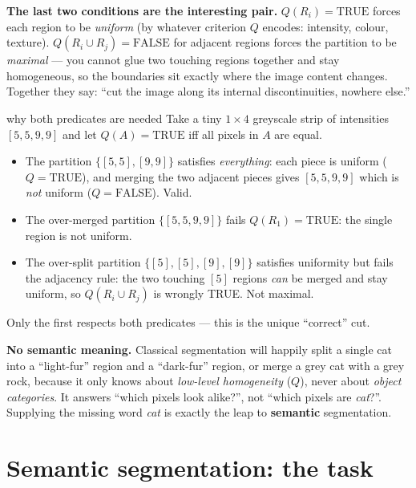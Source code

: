 \documentclass{report}
\begin{document}
\begin{keybox}
\textbf{The last two conditions are the interesting pair.} $Q(R_i)=\text{TRUE}$
forces each region to be \emph{uniform} (by whatever criterion $Q$ encodes:
intensity, colour, texture). $Q(R_i \cup R_j)=\text{FALSE}$ for adjacent regions
forces the partition to be \emph{maximal} --- you cannot glue two touching
regions together and stay homogeneous, so the boundaries sit exactly where the
image content changes. Together they say: ``cut the image along its internal
discontinuities, nowhere else.''
\end{keybox}

\begin{exbox}{why both predicates are needed}
Take a tiny $1\times 4$ greyscale strip of intensities $[5,5,9,9]$ and let
$Q(A)=\text{TRUE}$ iff all pixels in $A$ are equal.
\begin{itemize}
\item The partition $\{[5,5],[9,9]\}$ satisfies \emph{everything}: each piece is
uniform ($Q=\text{TRUE}$), and merging the two adjacent pieces gives $[5,5,9,9]$
which is \emph{not} uniform ($Q=\text{FALSE}$). Valid.
\item The over-merged partition $\{[5,5,9,9]\}$ fails $Q(R_1)=\text{TRUE}$: the
single region is not uniform.
\item The over-split partition $\{[5],[5],[9],[9]\}$ satisfies uniformity but
fails the adjacency rule: the two touching $[5]$ regions \emph{can} be merged
and stay uniform, so $Q(R_i\cup R_j)$ is wrongly TRUE. Not maximal.
\end{itemize}
Only the first respects both predicates --- this is the unique ``correct'' cut.
\end{exbox}

\begin{keybox}
\textbf{No semantic meaning.} Classical segmentation will happily split a single
cat into a ``light-fur'' region and a ``dark-fur'' region, or merge a grey cat
with a grey rock, because it only knows about \emph{low-level homogeneity}
($Q$), never about \emph{object categories}. It answers ``which pixels look
alike?'', not ``which pixels are \emph{cat}?''. Supplying the missing word
\emph{cat} is exactly the leap to \textbf{semantic} segmentation.
\end{keybox}

\section{Semantic segmentation: the task}
\end{document}
